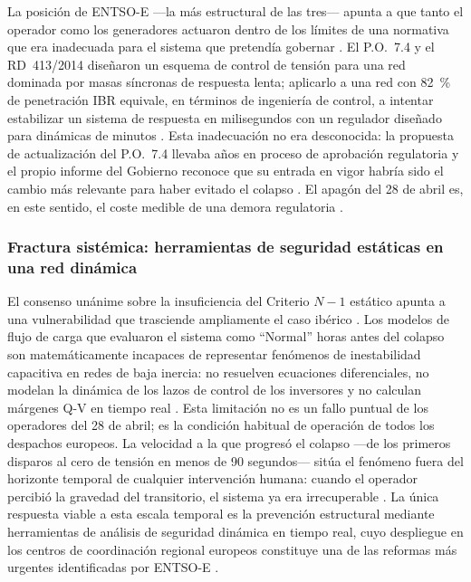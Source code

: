 La posición de ENTSO-E ---la más estructural de las tres--- apunta a
que tanto el operador como los generadores actuaron dentro de los
límites de una normativa que era inadecuada para el sistema que
pretendía gobernar \cite{entsoe2025}. El P.O.~7.4 y el RD~413/2014
diseñaron un esquema de control de tensión para una red dominada por
masas síncronas de respuesta lenta; aplicarlo a una red con 82~\% de
penetración IBR equivale, en términos de ingeniería de control, a
intentar estabilizar un sistema de respuesta en milisegundos con un
regulador diseñado para dinámicas de minutos
\cite{entsoe2025,futured2024,nrel2025}. Esta inadecuación no era
desconocida: la propuesta de actualización del P.O.~7.4 llevaba años
en proceso de aprobación regulatoria y el propio informe del
Gobierno reconoce que su entrada en vigor habría sido el cambio más
relevante para haber evitado el colapso \cite{gobierno2025}. El
apagón del 28 de abril es, en este sentido, el coste medible de una
demora regulatoria \cite{mitceepr2025}.

\subsubsection*{Fractura sistémica: herramientas de seguridad
estáticas en una red dinámica}

El consenso unánime sobre la insuficiencia del Criterio $N-1$
estático apunta a una vulnerabilidad que trasciende ampliamente el
caso ibérico \cite{entsoe2025,nrel2025,mitceepr2025}. Los modelos de
flujo de carga que evaluaron el sistema como ``Normal'' horas antes
del colapso son matemáticamente incapaces de representar fenómenos
de inestabilidad capacitiva en redes de baja inercia: no resuelven
ecuaciones diferenciales, no modelan la dinámica de los lazos de
control de los inversores y no calculan márgenes Q-V en tiempo
real \cite{entsoe2025}. Esta limitación no es un fallo puntual de
los operadores del 28 de abril; es la condición habitual de
operación de todos los despachos europeos. La velocidad a la que
progresó el colapso ---de los primeros disparos al cero de tensión
en menos de 90 segundos--- sitúa el fenómeno fuera del horizonte
temporal de cualquier intervención humana: cuando el operador
percibió la gravedad del transitorio, el sistema ya era
irrecuperable \cite{ree2025,entsoe2025}. La única respuesta viable
a esta escala temporal es la prevención estructural mediante
herramientas de análisis de seguridad dinámica en tiempo real, cuyo
despliegue en los centros de coordinación regional europeos
constituye una de las reformas más urgentes identificadas por
ENTSO-E \cite{entsoe2025,mitceepr2025}.

